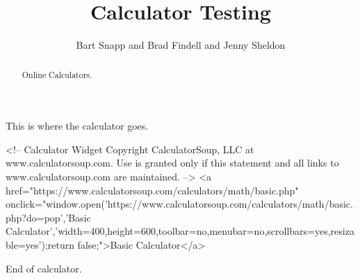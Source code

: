 \documentclass[nooutcomes]{ximera}
\title{Calculator Testing}
\author{Bart Snapp and Brad Findell and Jenny Sheldon}
\begin{document}
\begin{abstract}
Online Calculators.
\end{abstract}
\maketitle

This is where the calculator goes. 

\begin{javascript}
<!-- Calculator Widget Copyright CalculatorSoup, LLC at www.calculatorsoup.com. Use is granted only if this statement and all links to www.calculatorsoup.com are maintained. -->
<a href="https://www.calculatorsoup.com/calculators/math/basic.php" onclick="window.open('https://www.calculatorsoup.com/calculators/math/basic.php?do=pop','Basic Calculator','width=400,height=600,toolbar=no,menubar=no,scrollbars=yes,resizable=yes');return false;">Basic Calculator</a>
\end{javascript}

End of calculator. 
\end{document}
